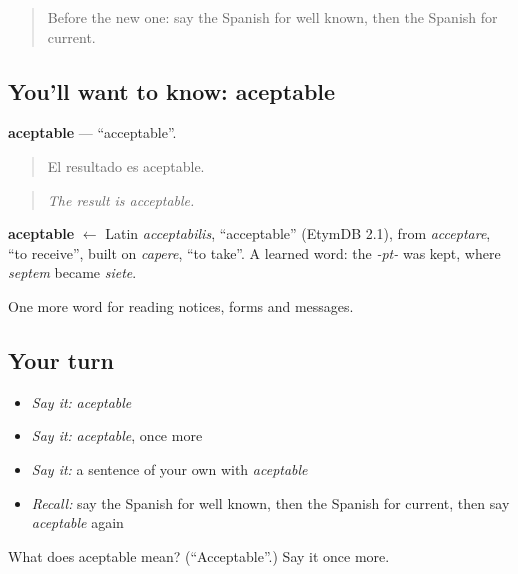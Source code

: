 \label{lesson:ES-C508-aceptable}



\begin{quote}
Before the new one: say the Spanish for well known, then the Spanish for current.
\end{quote}

\subsection*{You'll want to know: aceptable}
\textbf{aceptable} — \textquotedblleft{}acceptable\textquotedblright{}.

\begin{quote}
El resultado es aceptable.
\end{quote}

\begin{quote}
\emph{The result is acceptable.}
\end{quote}

\begin{cousinweb}
\textbf{aceptable} $\leftarrow$ Latin \emph{acceptabilis}, \textquotedblleft{}acceptable\textquotedblright{} (EtymDB 2.1), from \emph{acceptare}, \textquotedblleft{}to receive\textquotedblright{}, built on \emph{capere}, \textquotedblleft{}to take\textquotedblright{}. A learned word: the \emph{-pt-} was kept, where \emph{septem} became \emph{siete}.
\end{cousinweb}

\begin{grammarlens}[title={What you've built}]
One more word for reading notices, forms and messages.
\end{grammarlens}

\subsection*{Your turn}
\begin{itemize}
\raggedright
  \item \emph{Say it:} \emph{aceptable}
  \item \emph{Say it:} \emph{aceptable}, once more
  \item \emph{Say it:} a sentence of your own with \emph{aceptable}
  \item \emph{Recall:} say the Spanish for well known, then the Spanish for current, then say \emph{aceptable} again
\end{itemize}

\begin{tcolorbox}[breakable,colback=teal!4,colframe=teal!35!black,title={Before you move on}]
What does aceptable mean? (\textquotedblleft{}Acceptable\textquotedblright{}.) Say it once more.
\end{tcolorbox}
